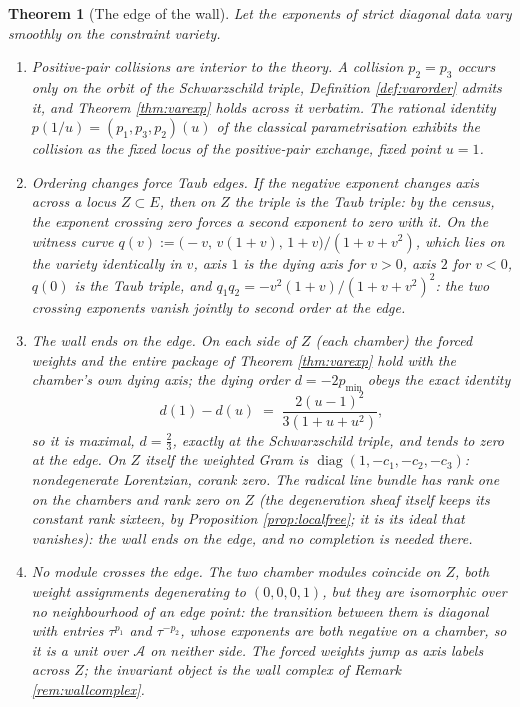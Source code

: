 \documentclass[11pt]{article}
\newtheorem{theorem}{Theorem}[section]
\theoremstyle{definition}
\begin{document}
\begin{theorem}[The edge of the wall]\label{thm:edge}
Let the exponents of strict diagonal data vary smoothly on the constraint variety.
\begin{enumerate}
\item \emph{Positive-pair collisions are interior to the theory.} A collision $p_2 = p_3$ occurs only on the orbit of the Schwarzschild triple, Definition \ref{def:varorder} admits it, and Theorem \ref{thm:varexp} holds across it verbatim. The rational identity $p(1/u) = (p_1, p_3, p_2)(u)$ of the classical parametrisation exhibits the collision as the fixed locus of the positive-pair exchange, fixed point $u = 1$.
\item \emph{Ordering changes force Taub edges.} If the negative exponent changes axis across a locus $Z \subset E$, then on $Z$ the triple is the Taub triple: by the census, the exponent crossing zero forces a second exponent to zero with it. On the witness curve $q(v) := \bigl(-v,\, v(1+v),\, 1+v\bigr)/(1+v+v^2)$, which lies on the variety identically in $v$, axis $1$ is the dying axis for $v > 0$, axis $2$ for $v < 0$, $q(0)$ is the Taub triple, and $q_1q_2 = -v^2(1+v)/(1+v+v^2)^2$: the two crossing exponents vanish jointly to second order at the edge.
\item \emph{The wall ends on the edge.} On each side of $Z$ (each \emph{chamber}) the forced weights and the entire package of Theorem \ref{thm:varexp} hold with the chamber's own dying axis; the dying order $d = -2p_{\min}$ obeys the exact identity
\[
d(1) - d(u) \;=\; \frac{2(u-1)^2}{3(1+u+u^2)},
\]
so it is \emph{maximal}, $d = \tfrac23$, exactly at the Schwarzschild triple, and tends to zero at the edge. On $Z$ itself the weighted Gram is $\operatorname{diag}(1,-c_1,-c_2,-c_3)$: nondegenerate Lorentzian, corank zero. The radical line bundle has rank one on the chambers and rank zero on $Z$ (the degeneration sheaf itself keeps its constant rank sixteen, by Proposition \ref{prop:localfree}; it is its ideal that vanishes): the wall ends on the edge, and no completion is needed there.
\item \emph{No module crosses the edge.} The two chamber modules coincide on $Z$, both weight assignments degenerating to $(0,0,0,1)$, but they are isomorphic over no neighbourhood of an edge point: the transition between them is diagonal with entries $\tau^{p_1}$ and $\tau^{-p_2}$, whose exponents are both negative on a chamber, so it is a unit over $\mathcal{A}$ on neither side. The forced weights jump as axis labels across $Z$; the invariant object is the wall complex of Remark \ref{rem:wallcomplex}.
\end{enumerate}
\end{theorem}
\end{document}
